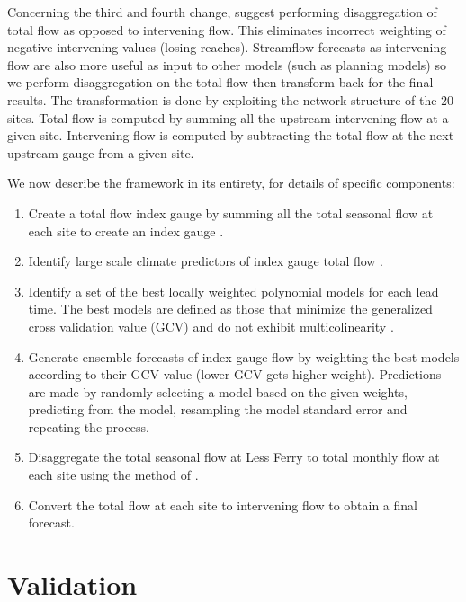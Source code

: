 \documentclass[final,5p,times,twocolumn,authoryear]{elsarticle}
\begin{document}
Concerning the third and fourth change, \cite{Nowak:2010ha} suggest performing disaggregation of total flow as opposed to intervening flow. This eliminates incorrect weighting of negative intervening values (losing reaches). Streamflow forecasts as intervening flow are also more useful as input to other models (such as planning models) so we perform disaggregation on the total flow then transform back for the final results. The transformation is done by exploiting the network structure of the 20 sites. Total flow is computed by summing all the upstream intervening flow at a given site.  Intervening flow is computed by subtracting the total flow at the next upstream gauge from a given site. 

We now describe the framework in its entirety, for details of specific components:
\begin{enumerate}
\item Create a total flow index gauge by summing all the total seasonal flow at each site to create an index gauge \cite{Bracken:2010cw}. 
\item Identify large scale climate predictors of index gauge total flow \citep{Grantz:2005ve}.
\item Identify a set of the best locally weighted polynomial models \cite{Loader:1999hx} for each lead time.  The best models are defined as those that minimize the generalized cross validation value (GCV) \citep{Craven1979} and do not exhibit multicolinearity \cite{Regonda2006}.
\item Generate ensemble forecasts \citep{Regonda2006,Hagedorn2005,Rajagopalan2002,Krishnamurti2000} of index gauge flow  by weighting the best models according to their GCV value (lower GCV gets higher weight).  Predictions are made by randomly selecting a model based on the given weights, predicting from the model, resampling the model standard error and repeating the process. 
\item Disaggregate the total seasonal flow at Less Ferry to total monthly flow at each site using the method of \cite{Nowak:2010ha}. 
\item Convert the total flow at each site to intervening flow to obtain a final forecast.
\end{enumerate}

\section{Validation}
\end{document}
